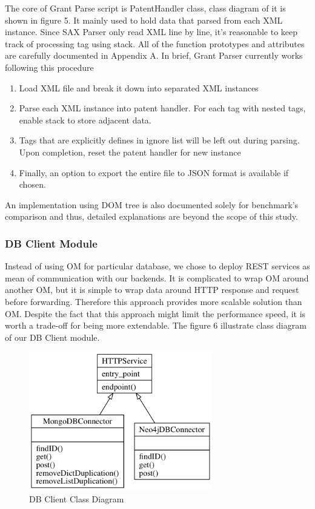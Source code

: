 \documentclass{sig-alternate}
\begin{document}
{The core of Grant Parse script is PatentHandler class, class diagram of it is shown in figure 5. It mainly used to hold data that parsed from each XML instance. Since SAX Parser only read XML line by line, it's reasonable to keep track of processing tag using stack. All of the function prototypes and attributes are carefully documented in Appendix A. In brief, Grant Parser currently works following this procedure
\begin{enumerate}
 \item Load XML file and break it down into separated XML instances
 \item Parse each XML instance into patent handler. For each tag with nested tags, enable stack to store adjacent data.
 \item Tags that are explicitly defines in ignore list will be left out during parsing. Upon completion, reset the patent handler for new instance
 \item Finally, an option to export the entire file to JSON format is available if chosen.
\end{enumerate}

An implementation using DOM tree is also documented solely for benchmark's comparison and thus, detailed explanations are beyond the scope of this study.

\subsubsection{DB Client Module}
Instead of using OM for particular database, we chose to deploy REST services as mean of communication with our backends. It is complicated to wrap OM around another OM, but it is simple to wrap data around HTTP response and request before forwarding. Therefore this approach provides more scalable solution than OM. Despite the fact that this approach might limit the performance speed, it is worth a trade-off for being more extendable. The figure 6 illustrate class diagram of our DB Client module.

\begin{figure}[htb]
\centering
\includegraphics[width=80mm,scale=10]{db_client.png}
\caption{ DB Client Class Diagram}
\end{figure}

}
\end{document}

